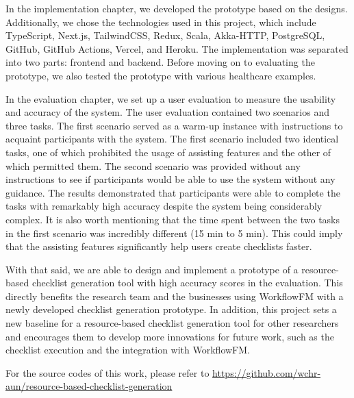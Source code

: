 In the implementation chapter, we developed the prototype based on the designs. Additionally, we chose the technologies used in this project, which include TypeScript, Next.js, TailwindCSS, Redux, Scala, Akka-HTTP, PostgreSQL, GitHub, GitHub Actions, Vercel, and Heroku. The implementation was separated into two parts: frontend and backend. Before moving on to evaluating the prototype, we also tested the prototype with various healthcare examples.

In the evaluation chapter, we set up a user evaluation to measure the usability and accuracy of the system. The user evaluation contained two scenarios and three tasks. The first scenario served as a warm-up instance with instructions to acquaint participants with the system. The first scenario included two identical tasks, one of which prohibited the usage of assisting features and the other of which permitted them. The second scenario was provided without any instructions to see if participants would be able to use the system without any guidance. The results demonstrated that participants were able to complete the tasks with remarkably high accuracy despite the system being considerably complex. It is also worth mentioning that the time spent between the two tasks in the first scenario was incredibly different (15 min to 5 min). This could imply that the assisting features significantly help users create checklists faster.

With that said, we are able to design and implement a prototype of a resource-based checklist generation tool with high accuracy scores in the evaluation.
This directly benefits the research team and the businesses using WorkflowFM with a newly developed checklist generation prototype. In addition, this project sets a new baseline for a resource-based checklist generation tool for other researchers and encourages them to develop more innovations for future work, such as the checklist execution and the integration with WorkflowFM.

For the source codes of this work, please refer to \href{https://github.com/wchr-aun/resource-based-checklist-generation}{https://github.com/wchr-aun/resource-based-checklist-generation}
